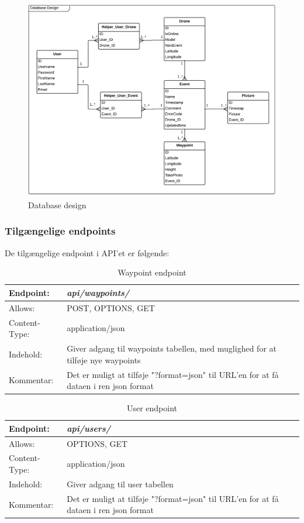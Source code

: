 \begin{figure}[H]
	\centering
	\includegraphics[width=1\textwidth]{Billeder/database/database_design.png}
	\vspace{-.5cm}
	\caption{Database design}
	\label{fig:database_design}
\end{figure}


\newpage
\subsubsection*{Tilgængelige endpoints}
De tilgængelige endpoint i API'et er følgende:

\begin{table}[H]
\begin{tabular}{| p{3cm}| p{11.5cm}|}
\hline
Endpoint:	 							& \textbf{\textit{api/waypoints/}}\\\hline
Allows:									& POST, OPTIONS, GET\\\hline
Content-Type:						& application/json\\\hline 
Indehold:								& Giver adgang til waypoints tabellen, med muglighed for at tilføje nye waypoints\\\hline 
Kommentar:							& Det er muligt at tilføje "?format=json" til URL'en for at få dataen i ren json format\\\hline
\end{tabular}
\caption{Waypoint endpoint}
\label{waypoint_endpoint}
\end{table}

\begin{table}[H]
\begin{tabular}{| p{3cm}| p{11.5cm}|}
\hline
Endpoint:	 							& \textbf{\textit{api/users/}} \\\hline
Allows:									& OPTIONS, GET\\\hline
Content-Type:						& application/json\\\hline 
Indehold:								& Giver adgang til user tabellen\\\hline 
Kommentar:							& Det er muligt at tilføje "?format=json" til URL'en for at få dataen i ren json format\\\hline
\end{tabular}
\caption{User endpoint}
\label{user_endpoint}
\end{table}

